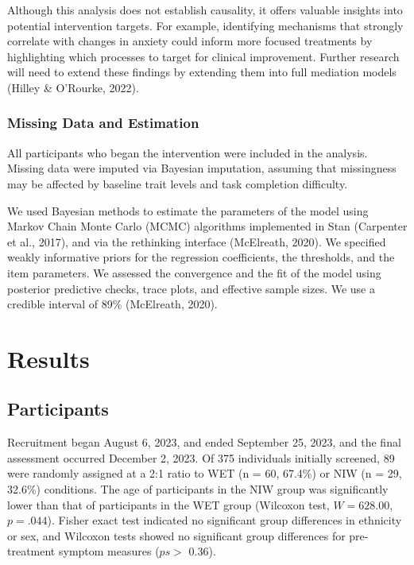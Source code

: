 \documentclass[
  man,floatsintext]{apa7}
\begin{document}
Although this analysis does not establish causality, it offers valuable insights into potential intervention targets.
For example, identifying mechanisms that strongly correlate with changes in anxiety could inform more focused treatments by highlighting which processes to target for clinical improvement.
Further research will need to extend these findings by extending them into full mediation models (Hilley \& O'Rourke, 2022).

\subsubsection{Missing Data and Estimation}\label{missing-data-and-estimation}

All participants who began the intervention were included in the analysis.
Missing data were imputed via Bayesian imputation, assuming that missingness may be affected by baseline trait levels and task completion difficulty.

We used Bayesian methods to estimate the parameters of the model using Markov Chain Monte Carlo (MCMC) algorithms implemented in Stan (Carpenter et al., 2017), and via the rethinking interface (McElreath, 2020).
We specified weakly informative priors for the regression coefficients, the thresholds, and the item parameters.
We assessed the convergence and the fit of the model using posterior predictive checks, trace plots, and effective sample sizes.
We use a credible interval of 89\% (McElreath, 2020).

\section{Results}\label{results}

\subsection{Participants}\label{participants-1}

Recruitment began August 6, 2023, and ended September 25, 2023, and the final assessment occurred December 2, 2023.
Of 375 individuals initially screened,
89 were randomly assigned at a 2:1 ratio to WET (n = 60, 67.4\%) or NIW (n = 29, 32.6\%) conditions.
The age of participants in the NIW group was significantly lower than that of participants in the WET group (Wilcoxon test, \(W = 628.00\), \(p = .044\)).
Fisher exact test indicated no significant group differences in ethnicity or sex, and Wilcoxon tests showed no significant group differences for pre-treatment symptom measures (\(ps >\) 0.36).
\end{document}
